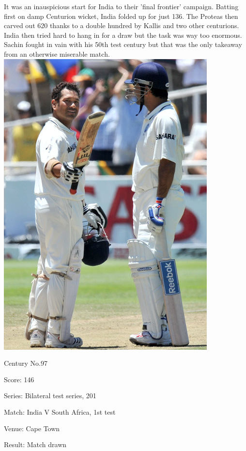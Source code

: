 \documentclass[11pt, a4paper]{article}
\begin{document}
It was an inauspicious start for India to their 'final frontier' campaign. Batting first on damp Centurion wicket, India folded up for just 136. The Proteas then carved out 620 thanks to a double hundred by Kallis and two other centurions. India then tried hard to hang in for a draw but the task was way too enormous. Sachin fought in vain with his 50th test century but that was the only takeaway from an otherwise miserable match.
\newpage
\includegraphics[height=0.7\textheight]{pics/97.jpg}

Century No.97 

Score: 146 

Series: Bilateral test series, 201 

Match: India V South Africa, 1st test 

Venue: Cape Town 

Result: Match drawn 
\end{document}
